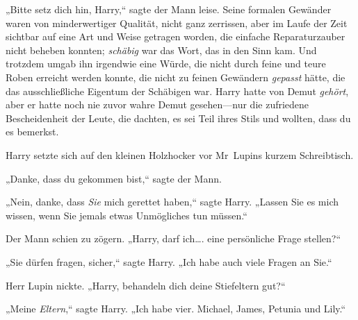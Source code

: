 „Bitte setz dich hin, Harry,“ sagte der Mann leise. Seine formalen Gewänder waren von minderwertiger Qualität, nicht ganz zerrissen, aber im Laufe der Zeit sichtbar auf eine Art und Weise getragen worden, die einfache Reparaturzauber nicht beheben konnten; \emph{schäbig} war das Wort, das in den Sinn kam. Und trotzdem umgab ihn irgendwie eine Würde, die nicht durch feine und teure Roben erreicht werden konnte, die nicht zu feinen Gewändern \emph{gepasst} hätte, die das ausschließliche Eigentum der Schäbigen war. Harry hatte von Demut \emph{gehört}, aber er hatte noch nie zuvor wahre Demut gesehen—nur die zufriedene Bescheidenheit der Leute, die dachten, es sei Teil ihres Stils und wollten, dass du es bemerkst.

Harry setzte sich auf den kleinen Holzhocker vor Mr~Lupins kurzem Schreibtisch.

„Danke, dass du gekommen bist,“ sagte der Mann.

„Nein, danke, dass \emph{Sie} mich gerettet haben,“ sagte Harry. „Lassen Sie es mich wissen, wenn Sie jemals etwas Unmögliches tun müssen.“

Der Mann schien zu zögern. „Harry, darf ich…. eine persönliche Frage stellen?“

„Sie dürfen fragen, sicher,“ sagte Harry. „Ich habe auch viele Fragen an Sie.“

Herr Lupin nickte. „Harry, behandeln dich deine Stiefeltern gut?“

„Meine \emph{Eltern},“ sagte Harry. „Ich habe vier. Michael, James, Petunia und Lily.“

